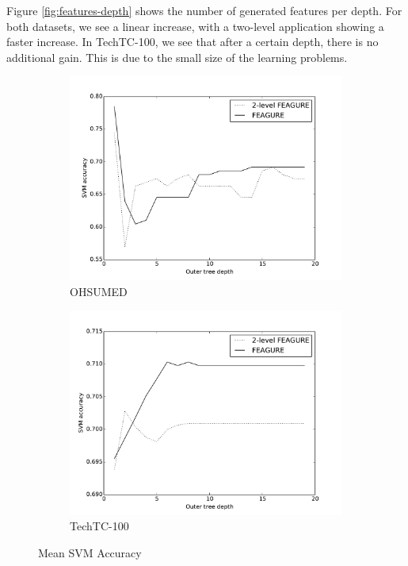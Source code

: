 \documentclass[twoside,11pt]{article}
\theoremstyle{definition}
\begin{document}
Figure \ref{fig:features-depth} shows the number of generated features per depth.  For both datasets, we see a linear increase, with a two-level application showing a faster increase. In TechTC-100, we see that after a certain depth, there is no additional gain. This is due to the small size of the learning problems.

\begin{figure}
	\centering
	\begin{subfigure}{.55\textwidth}
		\centering
		\includegraphics[width=1.1\linewidth]{svm_ohsumed.pdf}
		\caption{OHSUMED}
		\label{fig:svm-ohsumed}
	\end{subfigure}%
	\begin{subfigure}{.55\textwidth}
		\centering
		\includegraphics[width=1.1\linewidth]{svm_techtc.pdf}
		\caption{TechTC-100}
		\label{fig:svm-techtc}
	\end{subfigure}
	\caption{Mean SVM Accuracy}
	\label{fig:svm-acc}
\end{figure}
\end{document}
